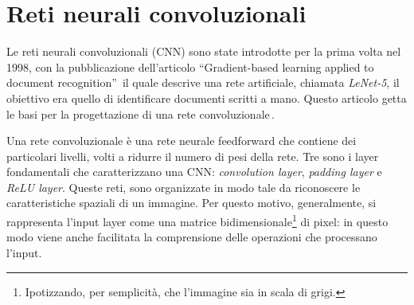 \section{Reti neurali convoluzionali}
% 
Le reti neurali convoluzionali (\acs{CNN}) sono state introdotte per la prima volta nel 1998, con la pubblicazione dell'articolo ``Gradient-based learning applied to document recognition''\,\cite{lecun1998gradient} il quale descrive una rete artificiale, chiamata \textit{LeNet-5}, il obiettivo era quello di identificare documenti scritti a mano. Questo articolo getta le basi per la progettazione di una rete convoluzionale\,\cite{aggarwal2018neural}.

Una rete convoluzionale è una rete neurale feedforward che contiene dei particolari livelli, volti a ridurre il numero di pesi della rete. Tre sono i layer fondamentali che caratterizzano una \acs{CNN}: \textit{convolution layer}, \textit{padding layer} e \textit{\acs{ReLU} layer}. Queste reti, sono organizzate in modo tale da riconoscere le caratteristiche spaziali di un immagine. Per questo motivo, generalmente, si rappresenta l'input layer come una matrice bidimensionale\footnote{Ipotizzando, per semplicità, che l'immagine sia in scala di grigi.} di pixel: in questo modo viene anche facilitata la comprensione delle operazioni che processano l'input.

